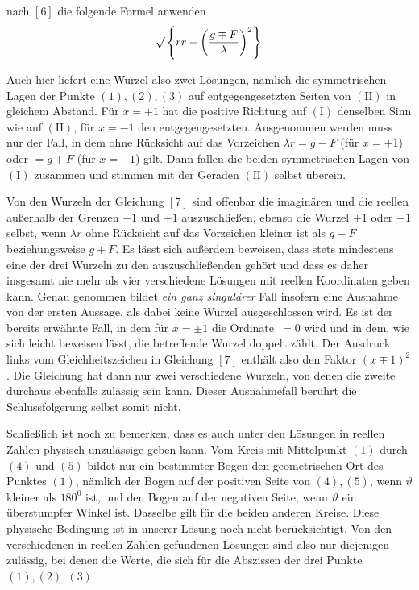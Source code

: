 %
nach \([6]\) die folgende Formel anwenden
\[\mathord{{}^{}\!\surd}\left\{rr-\left(\frac{g\mp F}{\lambda}\right)^2\right\}\]
\par
Auch hier liefert eine Wurzel also zwei Lösungen, nämlich die symmetrischen Lagen der Punkte \((1),(2),(3)\) auf entgegengesetzten Seiten von \(\mathrm{(II)}\) in gleichem Abstand. Für \(x=+1\) hat die positive Richtung auf \(\mathrm{(I)}\) denselben Sinn wie auf \(\mathrm{(II)}\), für \(x=-1\) den entgegengesetzten. Ausgenommen werden muss nur der Fall, in dem ohne Rücksicht auf das Vorzeichen \(\lambda r=g-F\) (für \(x=+1\)) oder \(=g+F\) (für \(x=-1\)) gilt. Dann fallen die beiden symmetrischen Lagen von \(\mathrm{(I)}\) zusammen und stimmen mit der Geraden \(\mathrm{(II)}\) selbst überein.

Von den Wurzeln der Gleichung \([7]\) sind offenbar die imaginären und die reellen außerhalb der Grenzen \(-1\) und \(+1\) auszuschließen, ebenso die Wurzel \(+1\) oder \(-1\) selbst, wenn \(\lambda r\) ohne Rücksicht auf das Vorzeichen kleiner ist als \(g-F\) beziehungsweise \(g+F\). Es lässt sich außerdem beweisen, dass stets mindestens eine der drei Wurzeln zu den auszuschließenden gehört und dass es daher insgesamt nie mehr als vier verschiedene Lösungen mit reellen Koordinaten geben kann. Genau genommen bildet \textit{ein ganz singulärer} Fall insofern eine Ausnahme von der ersten Aussage, als dabei keine Wurzel ausgeschlossen wird. Es ist der bereits erwähnte Fall, in dem für \(x=\pm1\) die Ordinate~\(=0\) wird und in dem, wie sich leicht beweisen lässt, die betreffende Wurzel doppelt zählt. Der Ausdruck links vom Gleichheitszeichen in Gleichung \([7]\) enthält also den Faktor \((x\mp1)^2\). Die Gleichung hat dann nur zwei verschiedene Wurzeln, von denen die zweite durchaus ebenfalls zulässig sein kann. Dieser Ausnahmefall berührt die Schlussfolgerung selbst somit nicht.

Schließlich ist noch zu bemerken, dass es auch unter den Lösungen in reellen Zahlen physisch unzulässige geben kann. Vom Kreis mit Mittelpunkt \((1)\) durch \((4)\) und \((5)\) bildet nur ein bestimmter Bogen den geometrischen Ort des Punktes \((1)\), nämlich der Bogen auf der positiven Seite von \((4),(5)\), wenn \(\vartheta\) kleiner als \(180^0\) ist, und den Bogen auf der negativen Seite, wenn \(\vartheta\) ein überstumpfer Winkel ist. Dasselbe gilt für die beiden anderen Kreise. Diese physische Bedingung ist in unserer Lösung noch nicht berücksichtigt. Von den verschiedenen in reellen Zahlen gefundenen Lösungen sind also nur diejenigen zulässig, bei denen die Werte, die sich für die Abszissen der drei Punkte \((1),(2),(3)\)
